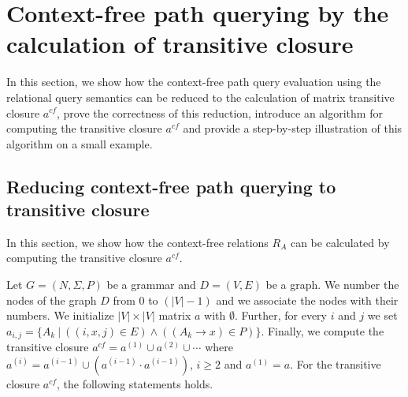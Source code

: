 \section{Context-free path querying by the calculation of transitive closure}
In this section, we show how the context-free path query evaluation using the relational query semantics can be reduced to the calculation of matrix transitive closure $a^{cf}$, prove the correctness of this reduction, introduce an algorithm for computing the transitive closure $a^{cf}$ and provide a step-by-step illustration of this algorithm on a small example.

\subsection{Reducing context-free path querying to transitive closure} \label{section_reducing}
In this section, we show how the context-free relations $R_A$ can be calculated by computing the transitive closure $a^{cf}$.

Let $G = (N,\Sigma,P)$ be a grammar and $D = (V, E)$ be a graph. We number the nodes of the graph $D$ from 0 to $(|V| - 1)$ and we associate the nodes with their numbers. We initialize $|V| \times |V|$ matrix $a$ with $\emptyset$. Further, for every $i$ and $j$ we set $a_{i,j} = \{A_k~|~((i,x,j) \in E) \wedge ((A_k \rightarrow x) \in P)\}$. Finally, we compute the transitive closure $a^{cf} = a^{(1)} \cup a^{(2)} \cup \cdots$ where $a^{(i)} = a^{(i-1)} \cup (a^{(i-1)} \cdot a^{(i-1)})$, $i \ge 2$ and $a^{(1)} = a$. For the transitive closure $a^{cf}$, the following statements holds.

